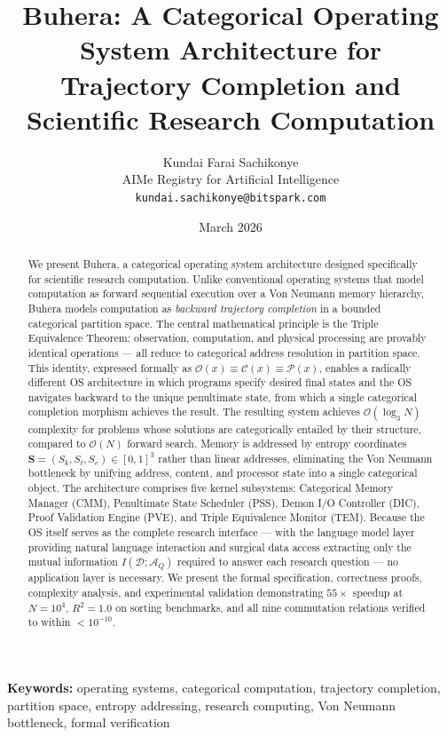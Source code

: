 \documentclass[12pt,twocolumn]{article}
\title{\textbf{Buhera: A Categorical Operating System Architecture for\\
Trajectory Completion and Scientific Research Computation}}
\author{
Kundai Farai Sachikonye\\
AIMe Registry for Artificial Intelligence\\
\texttt{kundai.sachikonye@bitspark.com}
}
\date{March 2026}
\begin{document}
\maketitle

\begin{abstract}
We present Buhera, a categorical operating system architecture designed specifically for scientific research computation. Unlike conventional operating systems that model computation as forward sequential execution over a Von Neumann memory hierarchy, Buhera models computation as \emph{backward trajectory completion} in a bounded categorical partition space. The central mathematical principle is the Triple Equivalence Theorem: observation, computation, and physical processing are provably identical operations --- all reduce to categorical address resolution in partition space. This identity, expressed formally as $\mathcal{O}(x) \equiv \mathcal{C}(x) \equiv \mathcal{P}(x)$, enables a radically different OS architecture in which programs specify desired final states and the OS navigates backward to the unique penultimate state, from which a single categorical completion morphism achieves the result. The resulting system achieves $\mathcal{O}(\log_3 N)$ complexity for problems whose solutions are categorically entailed by their structure, compared to $\mathcal{O}(N)$ forward search. Memory is addressed by entropy coordinates $\mathbf{S} = (S_k, S_t, S_e) \in [0,1]^3$ rather than linear addresses, eliminating the Von Neumann bottleneck by unifying address, content, and processor state into a single categorical object. The architecture comprises five kernel subsystems: Categorical Memory Manager (CMM), Penultimate State Scheduler (PSS), Demon I/O Controller (DIC), Proof Validation Engine (PVE), and Triple Equivalence Monitor (TEM). Because the OS itself serves as the complete research interface --- with the language model layer providing natural language interaction and surgical data access extracting only the mutual information $I(\mathcal{D}; \mathcal{A}_Q)$ required to answer each research question --- no application layer is necessary. We present the formal specification, correctness proofs, complexity analysis, and experimental validation demonstrating $55\times$ speedup at $N=10^4$, $R^2 = 1.0$ on sorting benchmarks, and all nine commutation relations verified to within $< 10^{-10}$.
\end{abstract}

\textbf{Keywords:} operating systems, categorical computation, trajectory completion, partition space, entropy addressing, research computing, Von Neumann bottleneck, formal verification
\end{document}
